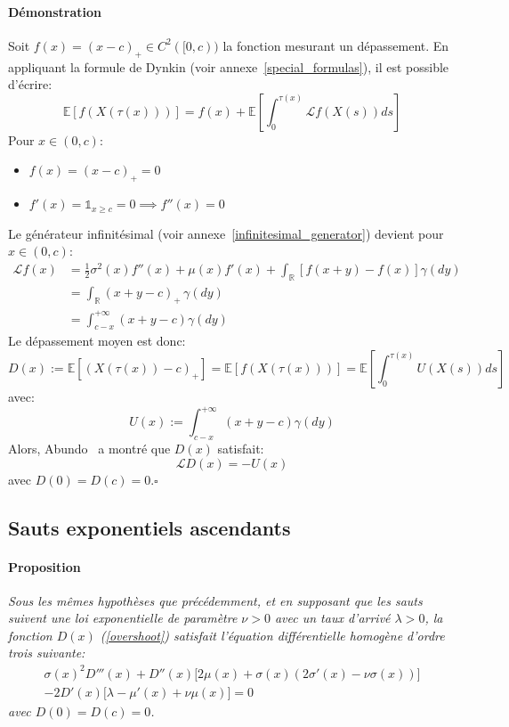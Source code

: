 \paragraph{Démonstration}
Soit $f(x)={(x-c)}_+\in C^2([0,c))$ la fonction mesurant un dépassement. En appliquant la formule de Dynkin (voir annexe~\ref{special_formulas}), il est possible d'écrire:
\begin{equation}\label{initial_dynkin}
    \mathds{E}[f(X(\tau(x)))]=f(x)+\mathds{E}\left[\int_0^{\tau(x)}\mathcal{L}f(X(s))ds\right]
\end{equation}
Pour $x\in(0,c)$:
\begin{itemize}
    \item $f(x)={(x-c)}_+=0$
    \item $f'(x)=\mathds{1}_{x\geq c}=0\implies f''(x)=0$
\end{itemize}
Le générateur infinitésimal (voir annexe~\ref{infinitesimal_generator}) devient pour \(x\in(0,c)\):
\[
\begin{aligned}
    \mathcal{L}f(x) &= \frac{1}{2}\sigma^2(x)f''(x)+\mu(x)f'(x)+\int_{\mathds{R}}[f(x+y)-f(x)]\gamma(dy)\\
    &=\int_{\mathds{R}}(x+y-c)_+\,\gamma(dy) \\
    &=\int_{c-x}^{+\infty}(x+y-c)\gamma(dy)
\end{aligned}
\]
Le dépassement moyen est donc:
\[
D(x):=\mathds{E}\left[{(X(\tau(x))-c)}_+\right]=\mathds{E}[f(X(\tau(x)))]=\mathds{E}\left[\int_0^{\tau(x)}U(X(s))ds\right]
\]
avec:
\[
U(x):=\int_{c-x}^{+\infty}(x+y-c)\gamma(dy)
\]
Alors, Abundo~\cite{abundo2013} a montré que $D(x)$ satisfait:
\begin{equation}\label{general_ide}
    \mathcal{L}D(x) = -U(x)
\end{equation}
avec $D(0)=D(c)=0$.\hfill$\square$

\subsection{Sauts exponentiels ascendants}
\paragraph{Proposition} 
\textit{Sous les mêmes hypothèses que précédemment, et en supposant que les sauts suivent une loi exponentielle de paramètre \(\nu > 0\) avec un taux d'arrivé \(\lambda > 0\), la fonction \(D(x)\) (\ref{overshoot}) satisfait l'équation différentielle homogène d'ordre trois suivante:}
\begin{equation}\label{eq:general_ode_D}
    \begin{aligned}
        \sigma(x)^2 D'''(x)+D''(x) \big[2 \mu(x)+\sigma(x)(2\sigma'(x)-\nu  \sigma(x))\big]\\-2D'(x)\big[\lambda-\mu'(x)+\nu\mu(x)\big]=0
    \end{aligned}
\end{equation}
\textit{avec \(D(0) = D(c) = 0\).}

